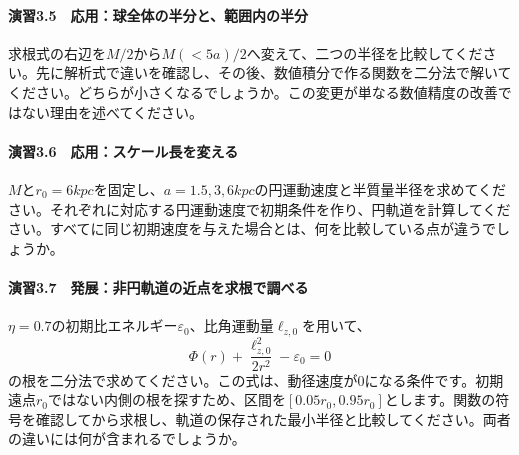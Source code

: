 \paragraph{演習3.5　応用：球全体の半分と、範囲内の半分}
求根式の右辺を$M/2$から$M(<5a)/2$へ変えて、二つの半径を比較してください。先に解析式で違いを確認し、その後、数値積分で作る関数を二分法で解いてください。どちらが小さくなるでしょうか。この変更が単なる数値精度の改善ではない理由を述べてください。

\paragraph{演習3.6　応用：スケール長を変える}
$M$と$r_0=6\unit{kpc}$を固定し、$a=1.5,3,6\unit{kpc}$の円運動速度と半質量半径を求めてください。それぞれに対応する円運動速度で初期条件を作り、円軌道を計算してください。すべてに同じ初期速度を与えた場合とは、何を比較している点が違うでしょうか。

\paragraph{演習3.7　発展：非円軌道の近点を求根で調べる}
$\eta=0.7$の初期比エネルギー$\varepsilon_0$、比角運動量$\ell_{z,0}$を用いて、
\begin{equation}
 \Phi(r)+\frac{\ell_{z,0}^2}{2r^2}-\varepsilon_0=0
 \label{eq:ch3-turning-point}
\end{equation}
の根を二分法で求めてください。この式は、動径速度が0になる条件です。初期遠点$r_0$ではない内側の根を探すため、区間を$[0.05r_0,0.95r_0]$とします。関数の符号を確認してから求根し、軌道の保存された最小半径と比較してください。両者の違いには何が含まれるでしょうか。
